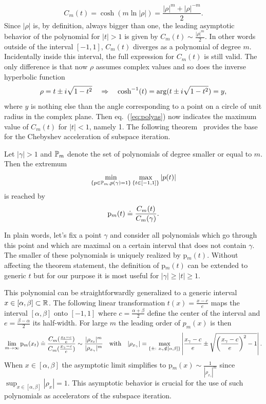 \begin{equation}
	C_m(t)=\cosh\left(m\ln\left|\rho\right|\right) =
        \frac{|\rho|^m+|\rho|^{-m}}{2}.
\label{eq:polyas}
\end{equation} 
Since $|\rho|$ is, by definition, always bigger than one, the leading
asymptotic behavior of the polynomial for $|t|>1$ is given by
$C_m(t) \sim \frac{|\rho|^m}{2}$. In other words outside of the
interval $[-1,1]$, $C_m(t)$ diverges as a polynomial of degree
$m$. Incidentally inside this interval, the full expression for
$C_m(t)$ is still valid. The only difference is that now $\rho$
assumes complex values and so does the inverse hyperbolic function
\[
	\rho = t \pm i \sqrt{1-t^2} \quad \Rightarrow \quad \textrm{cosh}^{-1}(t) = \arg(t \pm i \sqrt{1-t^2}) = y,
\]
where $y$ is nothing else than the angle corresponding to a point on a
circle of unit radius in the complex plane. Then eq.~(\ref{eq:polyas})
now indicates the maximum value of $C_m(t)$ for $|t|<1$, namely 1.
The following theorem~\cite{Saad:2011tu} provides the base for
the Chebyshev acceleration of subspace iteration.
\begin{theorem}
  Let $\left|\gamma\right|>1$ and $\mathbb{P}_m$ denote the set of
  polynomials of degree smaller or equal to $m$. Then the extremum
	\begin{equation*}
	\min_{\{p\in \mathbb{P}_m,p(\gamma)=1\}} \max_{\{t\in [-1,1]\}} {\left|p(t)\right|}
	\end{equation*}
is reached by
	\[
	{\rm p}_m (t) \doteq \frac{C_m(t)}{C_m(\gamma)}.
	\]
\label{th:approx}
\end{theorem}
In plain words, let's fix a point $\gamma$ and consider all
polynomials which go through this point and which are maximal on a
certain interval that does not contain $\gamma$. The smaller of these
polynomials is uniquely realized by p$_m(t)$. Without affecting the
theorem statement, the definition of p$_m(t)$ can be extended to
generic $t$ but for our purpose it is most useful for $|\gamma|\geq|t|\geq  1$.

This polynomial can be straightforwardly generalized to a generic
interval $x \in [\alpha,\beta] \subset \mathbb{R}$. The following linear
transformation $t(x)=\frac{x-c}{e}$ maps the interval $[\alpha,\beta]$
onto $[-1,1]$ where $c=\frac{\alpha+\beta}{2}$ define the center of
the interval and $e = \frac{\beta-\alpha}{2}$ its half-width. For large
$m$ the leading order of $p_m(x)$ is then
\begin{equation}
\lim_{m\rightarrow \infty} {\rm p}_m(x_t) \doteq \frac{C_m(\frac{x_t-c}{e})}
{C_m(\frac{x_{\gamma}-c}{e})} 
\sim \frac{|\rho_{x_t}|^m}{|\rho_{x_{\gamma}}|^m}  \quad \textrm{with}
\quad |\rho_{x_{\gamma}}|=\max_{\{\pm:\ x_\gamma\notin
  [\alpha,\beta]\}} \left|\frac{x_\gamma-c}{e} \pm 
\sqrt{\left(\frac{x_\gamma-c}{e}\right)^2-1}\right|.
\label{eq:rho}
\end{equation}
When $x\in[\alpha,\beta]$ the asymptotic limit simplifies to p$_m(x)
\sim \frac{1}{|\rho_{x_{\gamma}}|^m}$ since
$\sup_{x\in[\alpha,\beta]} |\rho_x| = 1$. This asymptotic behavior is
crucial for the use of such polynomials as accelerators of the
subspace iteration.  

